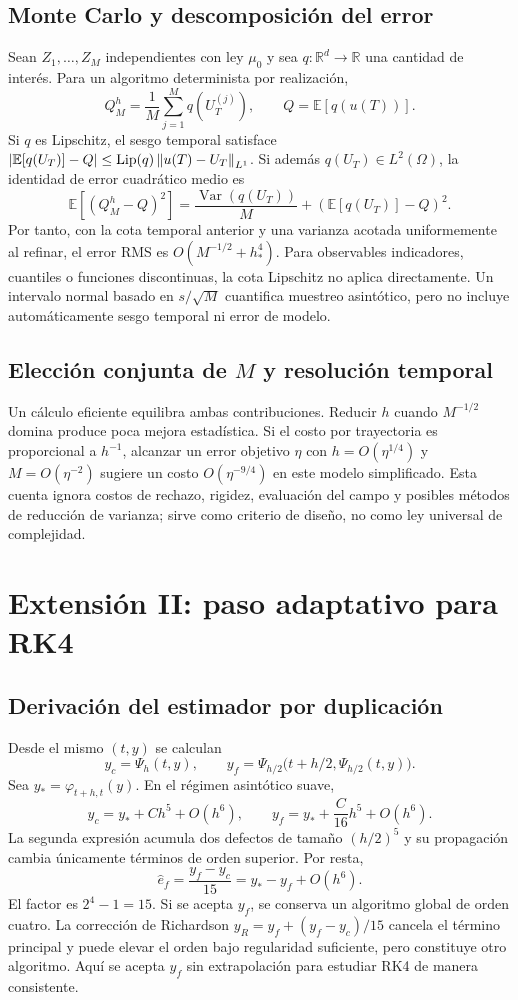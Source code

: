 \documentclass[11pt,a4paper]{article}
\theoremstyle{definition}\newtheorem{definition}[theorem]{Definición}
\theoremstyle{remark}\newtheorem{remark}[theorem]{Observación}
\newcommand{\R}{\mathbb R}\newcommand{\E}{\mathbb E}
\begin{document}
\subsection{Monte Carlo y descomposición del error}
Sean $Z_1,\ldots,Z_M$ independientes con ley $\mu_0$ y sea $q:\R^d\to\R$
una cantidad de interés. Para un algoritmo determinista por realización,
\[
 Q_M^h=\frac1M\sum_{j=1}^M q(U_T^{(j)}),
 \qquad Q=\E[q(u(T))].
\]
Si $q$ es Lipschitz, el sesgo temporal satisface
$|\E[q(U_T)]-Q|\leq\operatorname{Lip}(q)\norm{u(T)-U_T}_{L^1}$.
Si además $q(U_T)\in L^2(\Omega)$, la identidad de error cuadrático medio es
\begin{equation}\label{eq:mse}
 \E[(Q_M^h-Q)^2]
 =\frac{\operatorname{Var}(q(U_T))}{M}
  +\left(\E[q(U_T)]-Q\right)^2.
\end{equation}
Por tanto, con la cota temporal anterior y una varianza acotada uniformemente
al refinar, el error RMS es $O(M^{-1/2}+h_*^4)$. Para observables indicadores, cuantiles o funciones
discontinuas, la cota Lipschitz no aplica directamente. Un intervalo normal
basado en $s/\sqrt M$ cuantifica muestreo asintótico, pero no incluye
automáticamente sesgo temporal ni error de modelo.

\subsection{Elección conjunta de $M$ y resolución temporal}
Un cálculo eficiente equilibra ambas contribuciones. Reducir $h$ cuando
$M^{-1/2}$ domina produce poca mejora estadística. Si el costo por trayectoria
es proporcional a $h^{-1}$, alcanzar un error objetivo $\eta$ con
$h=O(\eta^{1/4})$ y $M=O(\eta^{-2})$ sugiere un costo
$O(\eta^{-9/4})$ en este modelo simplificado. Esta cuenta ignora costos de
rechazo, rigidez, evaluación del campo y posibles métodos de reducción de
varianza; sirve como criterio de diseño, no como ley universal de complejidad.

\clearpage
\section{Extensión II: paso adaptativo para RK4}
\subsection{Derivación del estimador por duplicación}
Desde el mismo $(t,y)$ se calculan
\[
 y_c=\Psi_h(t,y),\qquad
 y_f=\Psi_{h/2}\bigl(t+h/2,\Psi_{h/2}(t,y)\bigr).
\]
Sea $y_*=\varphi_{t+h,t}(y)$. En el régimen asintótico suave,
\[
 y_c=y_*+C h^5+O(h^6),\qquad
 y_f=y_*+\frac{C}{16}h^5+O(h^6).
\]
La segunda expresión acumula dos defectos de tamaño $(h/2)^5$ y su
propagación cambia únicamente términos de orden superior. Por resta,
\begin{equation}\label{eq:estimator}
 \widehat e_f=\frac{y_f-y_c}{15}=y_*-y_f+O(h^6).
\end{equation}
El factor es $2^4-1=15$. Si se acepta $y_f$, se conserva un algoritmo
global de orden cuatro. La corrección de Richardson
$y_R=y_f+(y_f-y_c)/15$ cancela el término principal y puede elevar el orden
bajo regularidad suficiente, pero constituye otro algoritmo. Aquí se acepta
$y_f$ sin extrapolación para estudiar RK4 de manera consistente.
\end{document}
